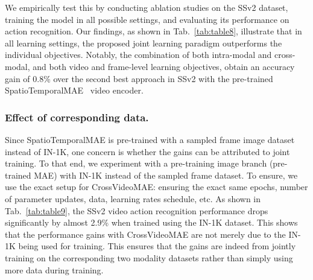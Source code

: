 We empirically test this by conducting ablation studies on the SSv2 dataset, training the model in all possible settings, and evaluating its performance on action recognition. Our findings, as shown in Tab.~\ref{tab:table8}, illustrate that in all learning settings, the proposed joint learning paradigm outperforms the individual objectives. Notably, the combination of both intra-modal and cross-modal, and both video and frame-level learning objectives, obtain an accuracy gain of 0.8\% over the second best approach in SSv2 with the pre-trained SpatioTemporalMAE~\cite{feichtenhofer2022masked} video encoder.

\subsubsection{Effect of corresponding data.} Since SpatioTemporalMAE is pre-trained with a sampled frame image dataset instead of IN-1K, one concern is whether the gains can be attributed to joint training. To that end, we experiment with a pre-training image branch (pre-trained MAE) with IN-1K instead of the sampled frame dataset. To ensure, we use the exact setup for CrossVideoMAE: ensuring the exact same epochs, number of parameter updates, data, learning rates schedule, etc. As shown in Tab.~\ref{tab:table9}, the SSv2 video action recognition performance drops significantly by almost 2.9\% when trained using the IN-1K dataset. This shows that the performance gains with CrossVideoMAE are not merely due to the IN-1K being used for training. This ensures that the gains are indeed from jointly training on the corresponding two modality datasets rather than simply using more data during training.

\begin{table}[h!]
\centering
{}
\caption{Effect of corresponding data}
\label{tab:table9}

\end{table}

